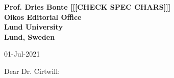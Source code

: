 \documentclass[12pt]{letter}
\begin{document}
\begin{letter}{\bf Prof. Dries Bonte [[[CHECK SPEC CHARS]]]\\
Oikos Editorial Office \\
Lund University \\
Lund, Sweden}








01-Jul-2021

Dear Dr. Cirtwill:


\end{letter}
\end{document}
